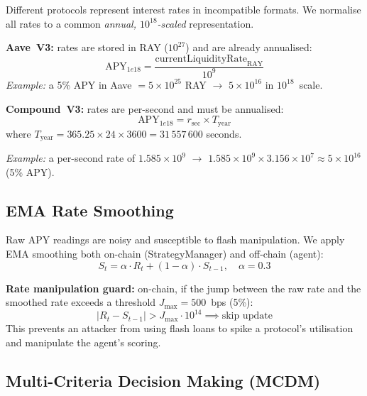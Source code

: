 \documentclass[12pt]{article}
\begin{document}
Different protocols represent interest rates in incompatible formats.
We normalise all rates to a common \emph{annual, $10^{18}$-scaled} representation.

\textbf{Aave~V3:} rates are stored in RAY ($10^{27}$) and are already annualised:
\begin{equation}
  \text{APY}_{1e18} = \frac{\text{currentLiquidityRate}_{\text{RAY}}}{10^9}
  \label{eq:aave-norm}
\end{equation}
\emph{Example:} a 5\% APY in Aave $= 5 \times 10^{25}$ RAY $\to$ $5 \times 10^{16}$ in $10^{18}$~scale.

\textbf{Compound~V3:} rates are per-second and must be annualised:
\begin{equation}
  \text{APY}_{1e18} = r_{\text{sec}} \times T_{\text{year}}
  \label{eq:compound-norm}
\end{equation}
where $T_{\text{year}} = 365.25 \times 24 \times 3600 = 31\,557\,600$ seconds.

\emph{Example:} a per-second rate of $1.585 \times 10^{9}$ $\to$ $1.585 \times 10^{9} \times 3.156 \times 10^{7} \approx 5 \times 10^{16}$ (5\% APY).

\subsection{EMA Rate Smoothing}

Raw APY readings are noisy and susceptible to flash manipulation.
We apply EMA smoothing both on-chain (StrategyManager) and off-chain (agent):
\begin{equation}
  S_t = \alpha \cdot R_t + (1 - \alpha) \cdot S_{t-1}, \quad \alpha = 0.3
  \label{eq:ema-rate}
\end{equation}

\textbf{Rate manipulation guard:} on-chain, if the jump between the raw rate and the smoothed rate exceeds a threshold $J_{\max} = 500$~bps (5\%):
\begin{equation}
  \lvert R_t - S_{t-1} \rvert > J_{\max} \cdot 10^{14} \implies \text{skip update}
  \label{eq:jump-guard}
\end{equation}
This prevents an attacker from using flash loans to spike a protocol's utilisation and manipulate the agent's scoring.

\subsection{Multi-Criteria Decision Making (MCDM)}
\label{sec:mcdm}
\end{document}
